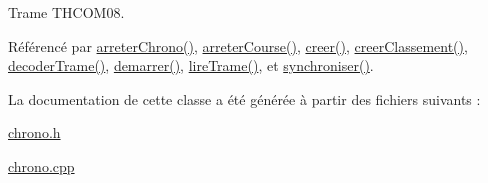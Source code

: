 Trame T\+H\+C\+O\+M08. 



Référencé par \hyperlink{class_chrono_a5e2781ab78dcaa0ecb37e301399d819b}{arreter\+Chrono()}, \hyperlink{class_chrono_a2a0d899b09eb044caa83b41574ac5edf}{arreter\+Course()}, \hyperlink{class_chrono_a74d85a4e856e2e59afacaa061feb7b75}{creer()}, \hyperlink{class_chrono_a0d7e3e50fcef0f2b0b7bfadc3d4f737d}{creer\+Classement()}, \hyperlink{class_chrono_a9a66b4e81385e2c354805548b94cdfb6}{decoder\+Trame()}, \hyperlink{class_chrono_a2ee875c24eb14f09011a40dfb3f1921f}{demarrer()}, \hyperlink{class_chrono_ae7c3c8494ace02f4c9dd714f6f0e574a}{lire\+Trame()}, et \hyperlink{class_chrono_a858a209a6d366b3adb95bcf593645d6a}{synchroniser()}.



La documentation de cette classe a été générée à partir des fichiers suivants \+:\begin{DoxyCompactItemize}
\item 
\hyperlink{chrono_8h}{chrono.\+h}\item 
\hyperlink{chrono_8cpp}{chrono.\+cpp}\end{DoxyCompactItemize}
